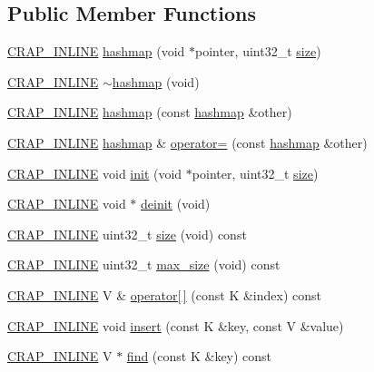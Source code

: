 \subsection*{Public Member Functions}
\begin{DoxyCompactItemize}
\item 
\hyperlink{config__x86_8h_a5a40526b8d842e7ff731509998bb0f1c}{C\+R\+A\+P\+\_\+\+I\+N\+L\+I\+N\+E} \hyperlink{classcrap_1_1hashmap_a9c2da6605e2ce4becacbad391cb0c9f1}{hashmap} (void $\ast$pointer, uint32\+\_\+t \hyperlink{classcrap_1_1hashmap_ac843c6a985b40c7669f5b2360555fb79}{size})
\item 
\hyperlink{config__x86_8h_a5a40526b8d842e7ff731509998bb0f1c}{C\+R\+A\+P\+\_\+\+I\+N\+L\+I\+N\+E} \hyperlink{classcrap_1_1hashmap_a51162df5f902c54f00636f1d522cc178}{$\sim$hashmap} (void)
\item 
\hyperlink{config__x86_8h_a5a40526b8d842e7ff731509998bb0f1c}{C\+R\+A\+P\+\_\+\+I\+N\+L\+I\+N\+E} \hyperlink{classcrap_1_1hashmap_a3a1085135a7a4087030cd77bde6b3406}{hashmap} (const \hyperlink{classcrap_1_1hashmap}{hashmap} \&other)
\item 
\hyperlink{config__x86_8h_a5a40526b8d842e7ff731509998bb0f1c}{C\+R\+A\+P\+\_\+\+I\+N\+L\+I\+N\+E} \hyperlink{classcrap_1_1hashmap}{hashmap} \& \hyperlink{classcrap_1_1hashmap_a3c969ffd9d18e2fea89835f64cc57ad4}{operator=} (const \hyperlink{classcrap_1_1hashmap}{hashmap} \&other)
\item 
\hyperlink{config__x86_8h_a5a40526b8d842e7ff731509998bb0f1c}{C\+R\+A\+P\+\_\+\+I\+N\+L\+I\+N\+E} void \hyperlink{classcrap_1_1hashmap_a5ff696cf3f7474d028c5880913a70e59}{init} (void $\ast$pointer, uint32\+\_\+t \hyperlink{classcrap_1_1hashmap_ac843c6a985b40c7669f5b2360555fb79}{size})
\item 
\hyperlink{config__x86_8h_a5a40526b8d842e7ff731509998bb0f1c}{C\+R\+A\+P\+\_\+\+I\+N\+L\+I\+N\+E} void $\ast$ \hyperlink{classcrap_1_1hashmap_a72e8837a88d38e4a82be149db450d57c}{deinit} (void)
\item 
\hyperlink{config__x86_8h_a5a40526b8d842e7ff731509998bb0f1c}{C\+R\+A\+P\+\_\+\+I\+N\+L\+I\+N\+E} uint32\+\_\+t \hyperlink{classcrap_1_1hashmap_ac843c6a985b40c7669f5b2360555fb79}{size} (void) const 
\item 
\hyperlink{config__x86_8h_a5a40526b8d842e7ff731509998bb0f1c}{C\+R\+A\+P\+\_\+\+I\+N\+L\+I\+N\+E} uint32\+\_\+t \hyperlink{classcrap_1_1hashmap_ad7f0876bbf7a6f8bae426bac465cd908}{max\+\_\+size} (void) const 
\item 
\hyperlink{config__x86_8h_a5a40526b8d842e7ff731509998bb0f1c}{C\+R\+A\+P\+\_\+\+I\+N\+L\+I\+N\+E} V \& \hyperlink{classcrap_1_1hashmap_a28d765e6b0fb29a7882f084cdd427887}{operator\mbox{[}$\,$\mbox{]}} (const K \&index) const 
\item 
\hyperlink{config__x86_8h_a5a40526b8d842e7ff731509998bb0f1c}{C\+R\+A\+P\+\_\+\+I\+N\+L\+I\+N\+E} void \hyperlink{classcrap_1_1hashmap_a158f033f63343bd601ee83c75061d996}{insert} (const K \&key, const V \&value)
\item 
\hyperlink{config__x86_8h_a5a40526b8d842e7ff731509998bb0f1c}{C\+R\+A\+P\+\_\+\+I\+N\+L\+I\+N\+E} V $\ast$ \hyperlink{classcrap_1_1hashmap_abae6c4b397855dca4c203a6de112e5e1}{find} (const K \&key) const 
\end{DoxyCompactItemize}
